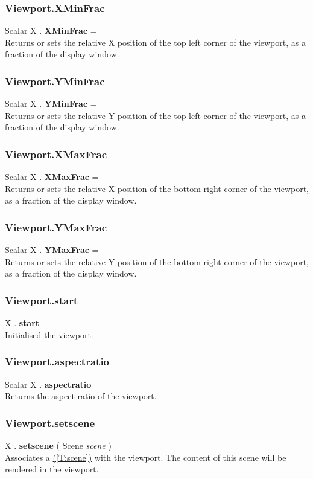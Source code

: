 \documentclass[10pt]{book}
\newcommand{\linkitem}[1]{\hyperref[#1]{\nameref{#1} (\ref{#1})}}
\begin{document}
\subsubsection{Viewport.XMinFrac \label{F:Viewport:XMinFrac}}
Scalar X . \textbf{XMinFrac} = \\
Returns or sets the relative X position of the top left corner of the viewport, as a fraction of the display window.

\subsubsection{Viewport.YMinFrac \label{F:Viewport:YMinFrac}}
Scalar X . \textbf{YMinFrac} = \\
Returns or sets the relative Y position of the top left corner of the viewport, as a fraction of the display window.

\subsubsection{Viewport.XMaxFrac \label{F:Viewport:XMaxFrac}}
Scalar X . \textbf{XMaxFrac} = \\
Returns or sets the relative X position of the bottom right corner of the viewport, as a fraction of the display window.

\subsubsection{Viewport.YMaxFrac \label{F:Viewport:YMaxFrac}}
Scalar X . \textbf{YMaxFrac} = \\
Returns or sets the relative Y position of the bottom right corner of the viewport, as a fraction of the display window.


\subsubsection{Viewport.start \label{F:Viewport:start}}
X . \textbf{start} \\
Initialised the viewport.

\subsubsection{Viewport.aspectratio \label{F:Viewport:aspectratio}}
Scalar X . \textbf{aspectratio} \\
Returns the aspect ratio of the viewport.

\subsubsection{Viewport.setscene \label{F:Viewport:setscene}}
X . \textbf{setscene} ( Scene \textit{scene} ) \\
Associates a \linkitem{T:scene} with the viewport. The content of this scene will be rendered in the viewport.
\end{document}
